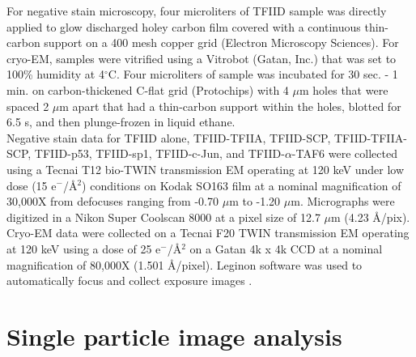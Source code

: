 \indent For negative stain microscopy, four microliters of TFIID sample was directly applied to glow discharged holey carbon film covered with a continuous thin-carbon support on a 400 mesh copper grid (Electron Microscopy Sciences). For cryo-EM, samples were vitrified using a Vitrobot (Gatan, Inc.) that was set to 100\% humidity at 4$^{\circ}$C. Four microliters of sample was incubated for 30 sec. - 1 min. on carbon-thickened C-flat grid (Protochips) with 4 $\mu$m holes that were spaced 2 $\mu$m apart that had a thin-carbon support within the holes, blotted for 6.5 s, and then plunge-frozen in liquid ethane. \\
\indent Negative stain data for TFIID alone, TFIID-TFIIA, TFIID-SCP, TFIID-TFIIA-SCP, TFIID-p53, TFIID-sp1, TFIID-c-Jun, and TFIID-$\alpha$-TAF6 were collected using a Tecnai T12 bio-TWIN transmission EM operating at 120 keV under low dose (15 e$^{-}$/\AA$^{2}$) conditions on Kodak SO163 film at a nominal magnification of 30,000X from defocuses ranging from -0.70 $\mu$m to -1.20 $\mu$m. Micrographs were digitized in a Nikon Super Coolscan 8000 at a pixel size of 12.7 $\mu$m (4.23 \AA/pix). Cryo-EM data were collected on a Tecnai F20 TWIN transmission EM operating at 120 keV using a dose of 25 e$^{-}$/\AA$^{2}$ on a Gatan 4k x 4k CCD at a nominal magnification of 80,000X (1.501 \AA/pixel). Leginon software was used to automatically focus and collect exposure images \cite{Suloway_1311}.

\section{Single particle image analysis}

